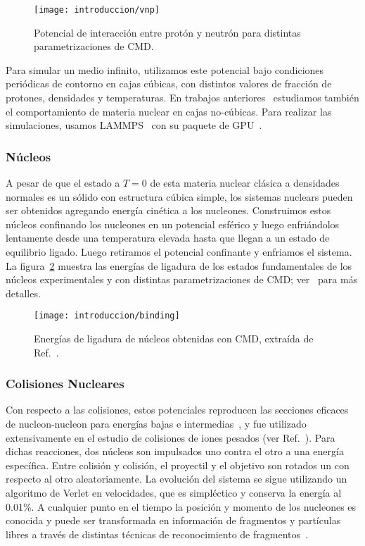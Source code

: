 \begin{figure}[h]
  \centering
  \texttt{[image: introduccion/vnp]}
  \caption{Potencial de interacción entre protón y neutrón para distintas parametrizaciones de CMD.}
\label{fig:vnp}
\end{figure}

Para simular un medio infinito, utilizamos este potencial bajo condiciones periódicas de contorno en cajas cúbicas, con distintos valores de fracción de protones, densidades y temperaturas.
En trabajos anteriores~\cite{gimenez_molinelli_finite_2015} estudiamos también el comportamiento de materia nuclear en cajas no-cúbicas.
Para realizar las simulaciones, usamos LAMMPS~\cite{plimpton_fast_1995} con su paquete de GPU~\cite{brown_implementing_2012}.

\subsubsection{Núcleos}
A pesar de que el estado a $T=0$ de esta materia nuclear clásica a densidades normales es un sólido con estructura cúbica simple, los sistemas nuclears pueden ser obtenidos agregando energía cinética a los nucleones.
Construimos estos núcleos confinando los nucleones en un potencial esférico y luego enfriándolos lentamente desde una temperatura elevada hasta que llegan a un estado de equilibrio ligado.
Luego retiramos el potencial confinante y enfriamos el sistema.
La figura~\ref{fig:int_binding} muestra las energías de ligadura de los estados fundamentales de los núcleos experimentales y con distintas parametrizaciones de CMD; ver~\cite{alcain_dynamics_2017} para más detalles.

\begin{figure}[h]
  \centering
  \texttt{[image: introduccion/binding]}
  \caption{Energías de ligadura de núcleos obtenidas con CMD, extraída de Ref.~\cite{alcain_dynamics_2017}.}
\label{fig:int_binding}
\end{figure}

\subsubsection{Colisiones Nucleares}
Con respecto a las colisiones, estos potenciales reproducen las secciones eficaces de nucleon-nucleon para energías bajas e intermedias~\cite{lenk_accuracy_1990}, y fue utilizado extensivamente en el estudio de colisiones de iones pesados (ver Ref.~\cite{chernomoretz_quasiclassical_2002, barranon_time_2007}).
Para dichas reacciones, dos núcleos son impulsados uno contra el otro a una energía específica.
Entre colisión y colisión, el proyectil y el objetivo son rotados un con respecto al otro aleatoriamente.
La evolución del sistema se sigue utilizando un algoritmo de Verlet en velocidades, que es simpléctico y conserva la energía al 0.01\%.
A cualquier punto en el tiempo la posición y momento de los nucleones es conocida y puede ser transformada en información de fragmentos y partículas libres a través de distintas técnicas de reconocimiento de fragmentos~\cite{dorso_early_1993, dorso_when_1995, strachan_time_1997}.


